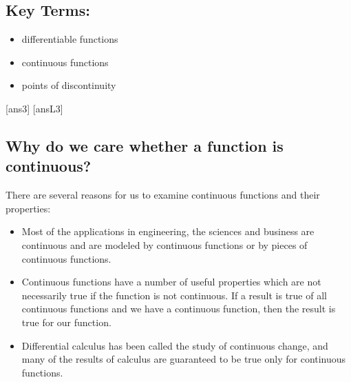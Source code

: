 \begin{framed}
\begin{itemize}
\begin{itemize}
    \end{itemize}
\end{itemize}
\subsection*{Key Terms:} 

\begin{multicols}{2}
\begin{itemize}
    \item differentiable functions
    \item continuous functions
    \item points of discontinuity
\end{itemize}
\end{multicols}
\end{framed}
\newpage
[ans3]
[ansL3]
\vspace{2in}
\subsection*{Why do we care whether a function is continuous?} %
There are several reasons for us to examine continuous functions and their properties:
\begin{itemize}
    \item Most of the applications in engineering, the sciences and business are continuous and are modeled by continuous functions or by pieces of continuous functions.
    \item Continuous functions have a number of useful properties which are not necessarily true if the function is not continuous. If a result is true of all continuous functions and we have a continuous function, then the result is true for our function. 
    \item Differential calculus has been called the study of continuous change, and many of the results of calculus are guaranteed to be true only for continuous functions.
\end{itemize}

